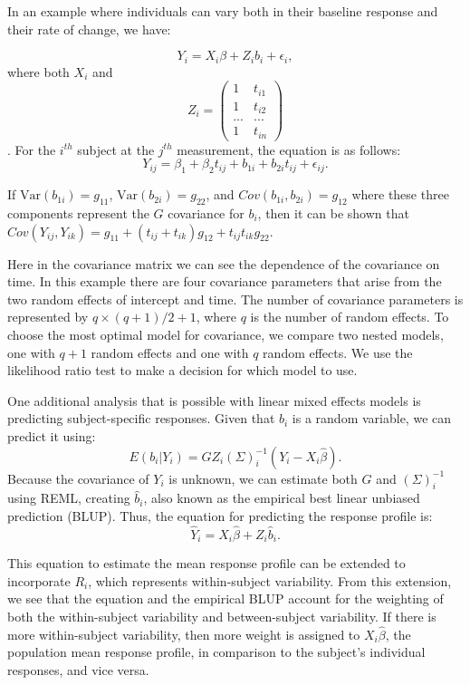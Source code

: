\documentclass[12pt, twoside]{amherstthesis}
\begin{document}
In an example where individuals can vary both in their baseline response and their rate of change, we have:

\[Y_i = X_i\beta+Z_ib_i+\epsilon_i,\] where both \(X_i\) and \[Z_i = \begin{pmatrix} 1 & t_{i1} \\ 1 & t_{i2} \\ ... & ... \\ 1 & t_{in}\end{pmatrix}\]. For the \(i^{th}\) subject at the \(j^{th}\) measurement, the equation is as follows: \[Y_{ij} = \beta_1 + \beta_2t_{ij} +b_{1i} + b_{2i}t_{ij} + \epsilon_{ij}.\]

If \(\text{Var}(b_{1i}) = g_{11}\), \(\text{Var}(b_{2i}) = g_{22}\), and \(Cov(b_{1i},b_{2i}) = g_{12}\) where these three components represent the \(G\) covariance for \(b_i\), then
it can be shown that \(Cov(Y_{ij}, Y_{ik}) = g_{11} + (t_{ij} + t_{ik})g_{12} + t_{ij}t_{ik}g_{22}\).

Here in the covariance matrix we can see the dependence of the covariance on time. In this example there are four covariance parameters that arise from the two random effects of intercept and time. The number of covariance parameters is represented by \(q \times (q+1)/2 + 1\), where \(q\) is the number of random effects. To choose the most optimal model for covariance, we compare two nested models, one with \(q+1\) random effects and one with \(q\) random effects. We use the likelihood ratio test to make a decision for which model to use.

One additional analysis that is possible with linear mixed effects models is predicting subject-specific responses. Given that \(b_i\) is a random variable, we can predict it using:
\[E(b_i |Y_i) = GZ_i (\Sigma)^{-1}_i(Y_i-X_i\hat\beta).\] Because the covariance of \(Y_i\) is unknown, we can estimate both \(G\) and \((\Sigma)^{-1}_i\) using REML, creating \(\hat b_i\), also known as the empirical best linear unbiased prediction (BLUP). Thus, the equation for predicting the response profile is:
\[\hat Y_i = X_i\hat\beta +Z_i\hat b_i.\]

This equation to estimate the mean response profile can be extended to incorporate \(R_i\), which represents within-subject variability. From this extension, we see that the equation and the empirical BLUP account for the weighting of both the within-subject variability and between-subject variability. If there is more within-subject variability, then more weight is assigned to \(X_i\hat\beta\), the population mean response profile, in comparison to the subject's individual responses, and vice versa.
\end{document}
